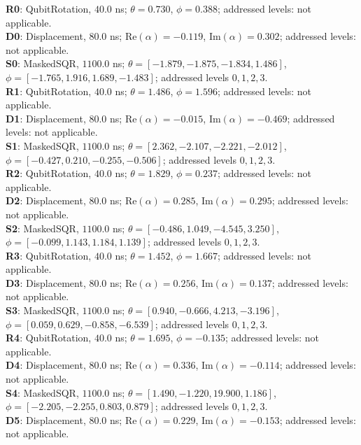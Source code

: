 ﻿\documentclass[aps,pra,twocolumn,reprint,amsmath,amssymb,floatfix]{revtex4-2}
\begin{document}
{\small
\begin{flushleft}
\textbf{R0}: QubitRotation, $40.0$ ns; $\theta=0.730$, $\phi=0.388$; addressed levels: not applicable.\\
\textbf{D0}: Displacement, $80.0$ ns; $\mathrm{Re}(\alpha)=-0.119$, $\mathrm{Im}(\alpha)=0.302$; addressed levels: not applicable.\\
\textbf{S0}: MaskedSQR, $1100.0$ ns; $\theta=[-1.879,-1.875,-1.834,1.486]$, $\phi=[-1.765,1.916,1.689,-1.483]$; addressed levels $0,1,2,3$.\\
\textbf{R1}: QubitRotation, $40.0$ ns; $\theta=1.486$, $\phi=1.596$; addressed levels: not applicable.\\
\textbf{D1}: Displacement, $80.0$ ns; $\mathrm{Re}(\alpha)=-0.015$, $\mathrm{Im}(\alpha)=-0.469$; addressed levels: not applicable.\\
\textbf{S1}: MaskedSQR, $1100.0$ ns; $\theta=[2.362,-2.107,-2.221,-2.012]$, $\phi=[-0.427,0.210,-0.255,-0.506]$; addressed levels $0,1,2,3$.\\
\textbf{R2}: QubitRotation, $40.0$ ns; $\theta=1.829$, $\phi=0.237$; addressed levels: not applicable.\\
\textbf{D2}: Displacement, $80.0$ ns; $\mathrm{Re}(\alpha)=0.285$, $\mathrm{Im}(\alpha)=0.295$; addressed levels: not applicable.\\
\textbf{S2}: MaskedSQR, $1100.0$ ns; $\theta=[-0.486,1.049,-4.545,3.250]$, $\phi=[-0.099,1.143,1.184,1.139]$; addressed levels $0,1,2,3$.\\
\textbf{R3}: QubitRotation, $40.0$ ns; $\theta=1.452$, $\phi=1.667$; addressed levels: not applicable.\\
\textbf{D3}: Displacement, $80.0$ ns; $\mathrm{Re}(\alpha)=0.256$, $\mathrm{Im}(\alpha)=0.137$; addressed levels: not applicable.\\
\textbf{S3}: MaskedSQR, $1100.0$ ns; $\theta=[0.940,-0.666,4.213,-3.196]$, $\phi=[0.059,0.629,-0.858,-6.539]$; addressed levels $0,1,2,3$.\\
\textbf{R4}: QubitRotation, $40.0$ ns; $\theta=1.695$, $\phi=-0.135$; addressed levels: not applicable.\\
\textbf{D4}: Displacement, $80.0$ ns; $\mathrm{Re}(\alpha)=0.336$, $\mathrm{Im}(\alpha)=-0.114$; addressed levels: not applicable.\\
\textbf{S4}: MaskedSQR, $1100.0$ ns; $\theta=[1.490,-1.220,19.900,1.186]$, $\phi=[-2.205,-2.255,0.803,0.879]$; addressed levels $0,1,2,3$.\\
\textbf{D5}: Displacement, $80.0$ ns; $\mathrm{Re}(\alpha)=0.229$, $\mathrm{Im}(\alpha)=-0.153$; addressed levels: not applicable.
\end{flushleft}
}
\end{document}
